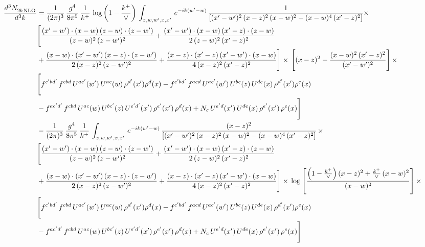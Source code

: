 \documentclass[9pt]{article}
\numberwithin{equation}{section}
\begin{document}
\begin{align}
    \frac{d^{3}N_{2b\,\rm NLO}^{\rm}}{d^{3}k}  & =  \frac{1}{(2\pi)^{3}}\, \frac{g^{4}}{8\pi^{5}}\,\frac{1}{k^{+}}\,\log{\left(1-\frac{k^{+}}{\vee}\right)}\,\int_{z,w,w^{\prime},x,x'}\, e^{-ik(w^{\prime}-w)}\, \frac{1}{\left[(x'-w')^{2}\,(x-z)^{2}\,(x-w)^{2} - (x-w)^{4}\, (x'-z)^{2}\right]} \times\notag \\ & \Bigg[\frac{(x'-w')\cdot (x-w)\, (z-w)\cdot (z-w')}{(z-w)^{2}\, (z-w')^{2}}+\frac{(x'-w')\cdot (x-w)\, (x'-z)\cdot (z-w)}{2\, (z-w)^{2}\, (x'-z)^{2}}\notag \\ & +\frac{(x-w)\cdot (x'-w')\, (x-z)\cdot (z-w')}{2\, (x-z)^{2}\, (z-w')^{2}}+\frac{(x-z)\cdot (x'-z)\, (x'-w')\cdot (x-w)}{4\, (x-z)^{2}\, (x'-z)^{2}}\Bigg] \times\,\Bigg[(x-z)^{2} - \frac{(x-w)^{2}\, (x'-z)^{2}}{(x'-w')^{2}}\Bigg]\,\times \notag \\ & \Bigg[f^{c'bd'}\,f^{cbd}\, U^{ac'}(w')\,U^{ac}(w)\,\rho^{d'}(x')\rho^{d}(x)- f^{c'bd'}\,f^{acd}\,U^{ac'}(w')\,U^{bc}(z)\,U^{de}(x)\,\rho^{d'}(x')\rho^{e}(x) \notag \\ & -f^{ac'd'}\,f^{cbd}\,U^{ac}(w)\,U^{bc'}(z)\,U^{e'd'}(x')\,\rho^{e'}(x')\,\rho^{d}(x) +N_{c}\,U^{e'd}(x')\,U^{de}(x)\,\rho^{e'}(x')\,\rho^{e}(x)\Bigg] \notag \\
&  - \frac{1}{(2\pi)^{3}}\, \frac{g^{4}}{8\pi^{5}}\,\frac{1}{k^{+}}\,\int_{z,w,w^{\prime},x,x'}\, e^{-ik(w^{\prime}-w)}\, \frac{(x-z)^{2}}{\left[(x'-w')^{2}\,(x-z)^{2}\,(x-w)^{2} - (x-w)^{4}\, (x'-z)^{2}\right]}\,  \times\notag \\ & \Bigg[\frac{(x'-w')\cdot (x-w)\, (z-w)\cdot (z-w')}{(z-w)^{2}\, (z-w')^{2}}+\frac{(x'-w')\cdot (x-w)\, (x'-z)\cdot (z-w)}{2\, (z-w)^{2}\, (x'-z)^{2}}\notag \\ & +\frac{(x-w)\cdot (x'-w')\, (x-z)\cdot (z-w')}{2\, (x-z)^{2}\, (z-w')^{2}}+\frac{(x-z)\cdot (x'-z)\, (x'-w')\cdot (x-w)}{4\, (x-z)^{2}\, (x'-z)^{2}}\Bigg] \times\,\log{\left[\frac{\left(1-\frac{k^{+}}{\vee}\right)(x-z)^{2}+\frac{k^{+}}{\vee}\,(x-w)^{2}}{(x-w)^{2}}\right]}\,\times \notag \\ & \Bigg[f^{c'bd'}\,f^{cbd}\, U^{ac'}(w')\,U^{ac}(w)\,\rho^{d'}(x')\rho^{d}(x)- f^{c'bd'}\,f^{acd}\,U^{ac'}(w')\,U^{bc}(z)\,U^{de}(x)\,\rho^{d'}(x')\rho^{e}(x) \notag \\ & -f^{ac'd'}\,f^{cbd}\,U^{ac}(w)\,U^{bc'}(z)\,U^{e'd'}(x')\,\rho^{e'}(x')\,\rho^{d}(x) +N_{c}\,U^{e'd}(x')\,U^{de}(x)\,\rho^{e'}(x')\,\rho^{e}(x)\Bigg] \notag \\

\end{align}
\end{document}
